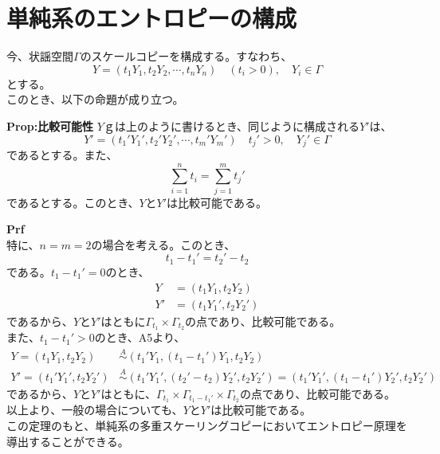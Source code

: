 \documentclass[a4paper,11pt]{jsarticle}
\begin{document}
\section{単純系のエントロピーの構成}
今、状謡空間$\Gamma$のスケールコピーを構成する。すなわち、
\begin{equation}
    Y =(t_1 Y_1,t_2 Y_2,\cdots,t_n Y_n) \quad (t_i>0), \quad Y_i \in \Gamma
\end{equation}
とする。\\
このとき、以下の命題が成り立つ。
\begin{itembox}[l]{\textbf{Prop:比較可能性}}
    $Y$ｇは上のように書けるとき、同じように構成される$Y'$は、
    \begin{equation}
        Y' =(t_1' Y_1',t_2' Y_2',\cdots,t_m' Y_m') \quad t_j'>0, \quad Y_j' \in \Gamma
    \end{equation}
    であるとする。また、
    \begin{equation}
        \sum_{i=1}^n t_i = \sum_{j=1}^m t_j'
    \end{equation}
    であるとする。このとき、$Y$と$Y'$は比較可能である。
\end{itembox}
\textbf{Prf}\\
特に、$n=m=2$の場合を考える。このとき、
\begin{equation}
    t_1-t_1' = t_2'-t_2
\end{equation}
である。$t_1-t_1' =0$のとき、
\begin{align}
    Y &= (t_1 Y_1,t_2 Y_2)\\
    Y' &= (t_1 Y_1',t_2 Y_2')
\end{align}
であるから、$Y$と$Y'$はともに$\Gamma _{t_1} \times \Gamma _{t_2}$の点であり、比較可能である。\\
また、$t_1-t_1' >0$のとき、A5より、
\begin{align}
    Y=(t_1 Y_1,t_2 Y_2) &\overset{A}{\sim} (t_1' Y_1,(t_1-t_1')Y_1,t_2 Y_2)\\
    Y'=(t_1' Y_1',t_2 Y_2') &\overset{A}{\sim} (t_1' Y_1',(t_2'-t_2)Y_2',t_2 Y_2')=(t_1' Y_1',(t_1-t_1')Y_2',t_2 Y_2')
\end{align}
であるから、$Y$と$Y'$はともに、$\Gamma _{t_1} \times \Gamma _{t_1-t_1'} \times \Gamma _{t_2}$の点であり、比較可能である。\\
以上より、一般の場合についても、$Y$と$Y'$は比較可能である。\qedsymbol\\
この定理のもと、単純系の多重スケーリングコピーにおいてエントロピー原理を導出することができる。\\
\end{document}
